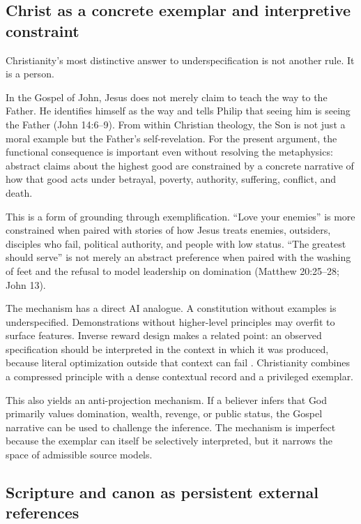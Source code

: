 \documentclass[11pt]{article}
\begin{document}
\subsection{Christ as a concrete exemplar and interpretive constraint}

Christianity's most distinctive answer to underspecification is not another rule. It is a person.

In the Gospel of John, Jesus does not merely claim to teach the way to the Father. He identifies himself as the way and tells Philip that seeing him is seeing the Father (John 14:6--9). From within Christian theology, the Son is not just a moral example but the Father's self-revelation. For the present argument, the functional consequence is important even without resolving the metaphysics: abstract claims about the highest good are constrained by a concrete narrative of how that good acts under betrayal, poverty, authority, suffering, conflict, and death.

This is a form of grounding through exemplification. ``Love your enemies'' is more constrained when paired with stories of how Jesus treats enemies, outsiders, disciples who fail, political authority, and people with low status. ``The greatest should serve'' is not merely an abstract preference when paired with the washing of feet and the refusal to model leadership on domination (Matthew 20:25--28; John 13).

The mechanism has a direct AI analogue. A constitution without examples is underspecified. Demonstrations without higher-level principles may overfit to surface features. Inverse reward design makes a related point: an observed specification should be interpreted in the context in which it was produced, because literal optimization outside that context can fail \parencite{hadfieldmenell2017ird}. Christianity combines a compressed principle with a dense contextual record and a privileged exemplar.

This also yields an anti-projection mechanism. If a believer infers that God primarily values domination, wealth, revenge, or public status, the Gospel narrative can be used to challenge the inference. The mechanism is imperfect because the exemplar can itself be selectively interpreted, but it narrows the space of admissible source models.

\subsection{Scripture and canon as persistent external references}
\end{document}

